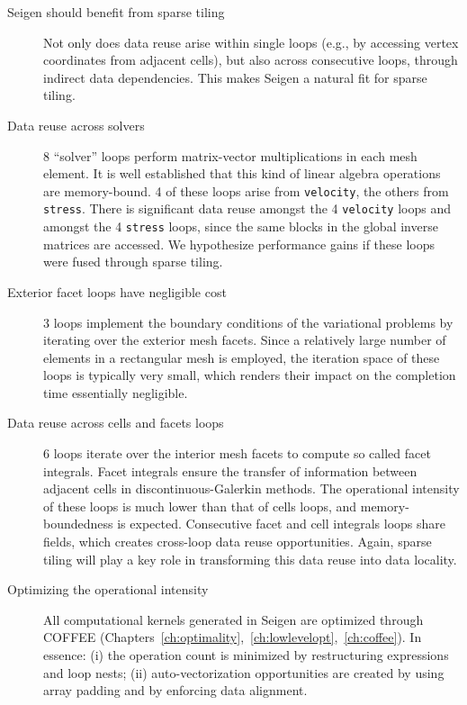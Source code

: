 \begin{description}
\item[Seigen should benefit from sparse tiling] Not only does data reuse arise within single loops (e.g., by accessing vertex coordinates from adjacent cells), but also across consecutive loops, through indirect data dependencies. This makes Seigen a natural fit for sparse tiling. 

\item[Data reuse across solvers] 8 ``solver'' loops perform matrix-vector multiplications in each mesh element. It is well established that this kind of linear algebra operations are memory-bound. 4 of these loops arise from {\tt velocity}, the others from {\tt stress}. There is significant data reuse amongst the 4 {\tt velocity} loops and amongst the 4 {\tt stress} loops, since the same blocks in the global inverse matrices are accessed. We hypothesize performance gains if these loops were fused through sparse tiling.

\item[Exterior facet loops have negligible cost] 3 loops implement the boundary conditions of the variational problems by iterating over the exterior mesh facets. Since a relatively large number of elements in a rectangular mesh is employed, the iteration space of these loops is typically very small, which renders their impact on the completion time essentially negligible.

\item[Data reuse across cells and facets loops] 6 loops iterate over the interior mesh facets to compute so called facet integrals. Facet integrals ensure the transfer of information between adjacent cells in discontinuous-Galerkin methods. The operational intensity of these loops is much lower than that of cells loops, and memory-boundedness is expected. Consecutive facet and cell integrals loops share fields, which creates cross-loop data reuse opportunities. Again, sparse tiling will play a key role in transforming this data reuse into data locality.

\item[Optimizing the operational intensity] All computational kernels generated in Seigen are optimized through COFFEE (Chapters~\ref{ch:optimality},~\ref{ch:lowlevelopt},~\ref{ch:coffee}). In essence: (i) the operation count is minimized by restructuring expressions and loop nests; (ii) auto-vectorization opportunities are created by using array padding and by enforcing data alignment.
\end{description}



